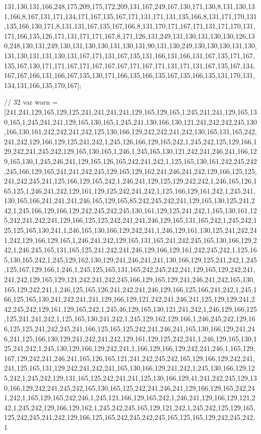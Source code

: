 131,130,131,166,248,175,209,175,172,209,131,167,249,167,130,171,130,8,131,130,131,166,8,167,131,171,134,171,167,135,167,171,131,171,131,135,166,8,131,171,170,131,135,166,130,171,8,131,131,167,135,167,166,8,131,170,171,167,171,131,171,170,131,171,166,135,126,171,131,171,171,167,8,171,126,131,249,131,130,131,130,130,126,130,248,130,131,249,130,131,130,130,131,130,131,90,131,130,249,130,130,130,131,130,131,130,131,131,130,131,167,171,131,167,135,131,166,131,166,131,167,135,171,167,135,167,130,171,171,167,171,167,167,167,171,167,171,131,171,131,167,135,167,134,167,167,166,131,166,167,135,130,171,166,135,166,135,167,135,166,135,131,170,131,134,131,166,135,170,167];

// 32
var warn = [241,241,129,165,129,125,241,241,241,241,129,165,129,165,1,245,241,241,129,165,130,165,1,245,241,241,129,165,130,165,1,245,241,130,166,130,121,241,242,242,245,130,166,130,161,242,242,241,242,125,130,166,129,242,242,241,242,130,165,131,165,242,241,242,129,166,129,125,241,242,1,245,126,166,129,165,242,1,245,242,125,129,166,129,242,241,245,242,129,165,130,165,1,246,1,245,165,130,121,242,241,246,241,166,129,165,130,1,245,246,241,129,165,126,165,242,241,242,1,125,165,130,161,242,245,242,245,166,129,165,241,241,242,245,129,165,129,162,241,246,241,242,129,166,125,125,241,242,245,241,125,166,129,165,242,1,246,241,129,125,129,242,242,1,246,165,126,165,125,1,246,241,242,129,161,129,125,242,241,242,1,125,166,129,161,242,1,245,241,130,165,166,241,241,241,246,165,129,165,85,242,245,242,241,129,165,130,125,241,242,1,245,166,129,166,129,242,245,242,245,130,161,129,125,241,242,1,165,130,161,125,242,241,242,241,129,166,125,125,242,241,241,246,129,165,131,165,242,1,245,242,125,125,165,130,241,1,246,165,130,166,129,242,241,1,246,129,161,130,125,241,242,241,242,129,166,129,165,1,246,241,242,129,165,131,165,241,242,245,165,130,166,129,242,1,246,245,165,131,165,125,241,242,241,246,129,166,129,161,242,245,242,1,125,165,130,165,242,1,245,129,162,130,129,241,246,241,241,130,166,129,125,241,242,1,245,125,167,129,166,1,246,1,245,125,165,131,165,242,245,242,241,129,165,129,242,241,241,242,129,165,129,121,242,241,242,245,166,129,165,129,241,246,241,242,165,130,165,129,242,241,1,246,125,165,126,241,242,241,246,129,166,125,166,241,242,1,245,166,125,165,130,241,242,241,241,129,166,129,121,242,241,246,241,125,129,129,241,242,245,242,129,161,129,165,242,1,245,46,129,165,130,121,241,242,1,246,129,166,125,125,241,241,242,1,125,165,130,241,242,1,245,129,162,129,166,1,246,245,242,129,166,125,125,241,242,245,241,166,125,165,125,242,241,246,241,165,130,166,129,241,246,241,125,166,130,129,241,242,241,242,129,161,129,125,242,241,1,246,129,165,130,125,241,242,1,245,130,129,166,129,242,241,1,166,129,166,129,242,241,246,1,165,129,167,129,242,241,246,241,165,126,165,121,241,242,245,242,165,129,166,129,242,241,241,125,165,131,129,242,241,242,241,165,130,166,129,241,242,1,245,130,166,129,125,242,1,245,242,129,131,165,125,242,241,241,125,130,166,129,41,241,242,245,129,130,166,129,242,241,245,242,165,130,165,125,242,241,246,241,129,166,129,165,242,241,242,1,165,129,165,242,246,1,245,121,166,129,165,242,1,246,241,129,166,129,121,242,1,245,242,129,166,129,162,1,245,242,245,165,129,121,242,1,245,242,125,129,165,125,242,245,241,242,129,166,125,165,242,245,242,245,165,125,165,129,242,245,242,1